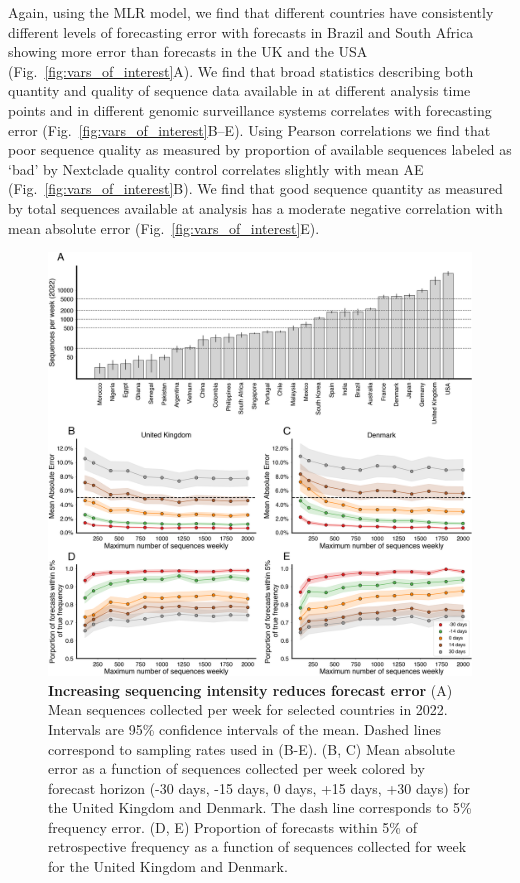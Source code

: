 \documentclass[11pt,oneside,letterpaper]{article}
\begin{document}
Again, using the MLR model, we find that different countries have consistently different levels of forecasting error with forecasts in Brazil and South Africa showing more error than forecasts in the UK and the USA  (Fig.~\ref{fig:vars_of_interest}A).
We find that broad statistics describing both quantity and quality of sequence data available in at different analysis time points and in different genomic surveillance systems correlates with forecasting error (Fig.~\ref{fig:vars_of_interest}B--E).
Using Pearson correlations we find that poor sequence quality as measured by proportion of available sequences labeled as `bad' by Nextclade quality control \cite{aksamentov2021nextclade} correlates slightly with mean AE (Fig.~\ref{fig:vars_of_interest}B).
We find that good sequence quantity as measured by total sequences available at analysis has a moderate negative correlation with mean absolute error (Fig.~\ref{fig:vars_of_interest}E).

\begin{figure}[tb!]
    \centering
    \includegraphics[width=1.0\linewidth]{figures/downscaling_sequencing.png}
    \caption{
			\textbf{Increasing sequencing intensity reduces forecast error}
    	(A) Mean sequences collected per week for selected countries in 2022.
			Intervals are 95\% confidence intervals of the mean.
			Dashed lines correspond to sampling rates used in (B-E).
    	(B, C) Mean absolute error as a function of sequences collected per week colored by forecast horizon (-30 days, -15 days, 0 days, +15 days, +30 days) for the United Kingdom and Denmark.
			The dash line corresponds to 5\% frequency error.
    	(D, E) Proportion of forecasts within 5\% of retrospective frequency as a function of sequences collected for week for the United Kingdom and Denmark.
  	}
    \label{fig:downscaling}
\end{figure}
\end{document}

